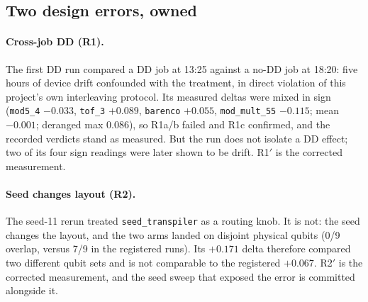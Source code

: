 \subsection{Two design errors, owned}\label{sec:errors}

\paragraph{Cross-job DD (R1).} The first DD run compared a DD job at 13:25 against a no-DD job at 18:20: five hours of device drift confounded with the treatment, in direct violation of this project's own interleaving protocol. Its measured deltas were mixed in sign (\texttt{mod5\_4} $-0.033$, \texttt{tof\_3} $+0.089$, \texttt{barenco} $+0.055$, \texttt{mod\_mult\_55} $-0.115$; mean $-0.001$; deranged max 0.086), so R1a/b failed and R1c confirmed, and the recorded verdicts stand as measured. But the run does not isolate a DD effect; two of its four sign readings were later shown to be drift. R1$'$ is the corrected measurement.

\paragraph{Seed changes layout (R2).} The seed-11 rerun treated \texttt{seed\_transpiler} as a routing knob. It is not: the seed changes the layout, and the two arms landed on disjoint physical qubits (0/9 overlap, versus 7/9 in the registered runs). Its $+0.171$ delta therefore compared two different qubit sets and is not comparable to the registered $+0.067$. R2$'$ is the corrected measurement, and the seed sweep that exposed the error is committed alongside it.
